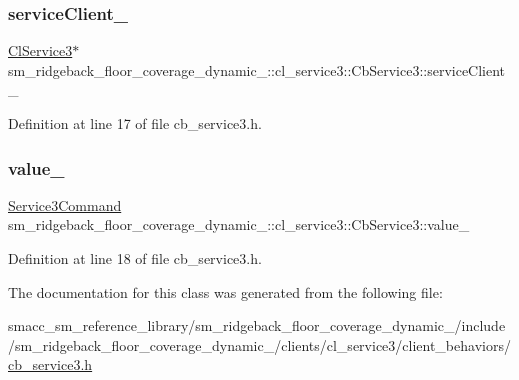 \subsubsection{\texorpdfstring{service\+Client\+\_\+}{serviceClient\_}}
{\footnotesize\ttfamily \hyperlink{classsm__ridgeback__floor__coverage__dynamic__1_1_1cl__service3_1_1ClService3}{Cl\+Service3}$\ast$ sm\+\_\+ridgeback\+\_\+floor\+\_\+coverage\+\_\+dynamic\+\_\+::cl\+\_\+service3\+::\+Cb\+Service3\+::service\+Client\+\_\+\hspace{0.3cm}{\ttfamily [private]}}



Definition at line 17 of file cb\+\_\+service3.\+h.

\mbox{\label{classsm__ridgeback__floor__coverage__dynamic__1_1_1cl__service3_1_1CbService3_a2ef778d30aaafb2171697f39a1d42402}} 
\subsubsection{\texorpdfstring{value\+\_\+}{value\_}}
{\footnotesize\ttfamily \hyperlink{namespacesm__ridgeback__floor__coverage__dynamic__1_1_1cl__service3_a44063f74ff3bc29b2e2e09b19416e604}{Service3\+Command} sm\+\_\+ridgeback\+\_\+floor\+\_\+coverage\+\_\+dynamic\+\_\+::cl\+\_\+service3\+::\+Cb\+Service3\+::value\+\_\+\hspace{0.3cm}{\ttfamily [private]}}



Definition at line 18 of file cb\+\_\+service3.\+h.



The documentation for this class was generated from the following file\+:\begin{DoxyCompactItemize}
\item 
smacc\+\_\+sm\+\_\+reference\+\_\+library/sm\+\_\+ridgeback\+\_\+floor\+\_\+coverage\+\_\+dynamic\+\_/include/sm\+\_\+ridgeback\+\_\+floor\+\_\+coverage\+\_\+dynamic\+\_/clients/cl\+\_\+service3/client\+\_\+behaviors/\hyperlink{sm__ridgeback__floor__coverage__dynamic__1_2include_2sm__ridgeback__floor__coverage__dynamic__1_673518ba6b73212031d4e26bb719b1a5}{cb\+\_\+service3.\+h}\end{DoxyCompactItemize}
